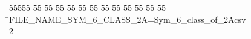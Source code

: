 %
%
\begin{tabbing}
55555 \= 55 \= 55 \= 55 \= 55 \= 55 \= 55 \= 55 \= 55 \= 55 \= 55 \= 55 \= 55 \= \>FILE\_NAME\_SYM\_6\_CLASS\_2A=Sym\_6\_class\_of\_2Acsv\\[0pt]
2\>\end{tabbing}
